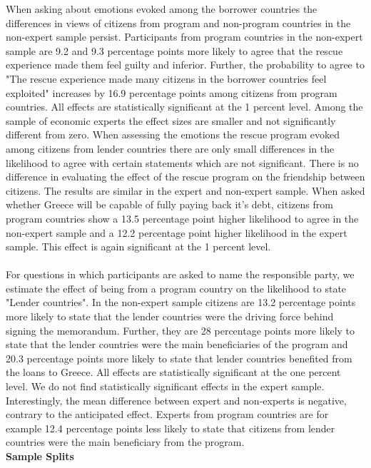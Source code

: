 When asking about emotions evoked among the borrower countries the differences in views of citizens from program and non-program countries in the non-expert sample persist. Participants from program countries in the non-expert sample are 9.2 and 9.3 percentage points more likely to agree that the rescue experience made them feel guilty and inferior. Further, the probability to agree to "The rescue experience made many citizens in the borrower countries feel exploited" increases by 16.9 percentage points among citizens from program countries. All effects are statistically significant at the 1 percent level. Among the sample of economic experts the effect sizes are smaller and not significantly different from zero. When assessing the emotions the rescue program evoked among citizens from lender countries there are only small differences in the likelihood to agree with certain statements which are not significant. There is no difference in evaluating the effect of the rescue program on the friendship between citizens. The results are similar in the expert and non-expert sample. When asked whether Greece will be capable of fully paying back it's debt, citizens from program countries show a 13.5 percentage point higher likelihood to agree in the non-expert sample and a 12.2 percentage point higher likelihood in the expert sample. This effect is again significant at the 1 percent level. \\ \\
For questions in which participants are asked to name the responsible party, we estimate the effect of being from a program country on the likelihood to state "Lender countries". In the non-expert sample citizens are 13.2 percentage points more likely to state that the lender countries were the driving force behind signing the memorandum. Further, they are 28 percentage points more likely to state that the lender countries were the main beneficiaries of the program and 20.3 percentage points more likely to state that lender countries benefited from the loans to Greece. All effects are statistically significant at the one percent level. We do not find statistically significant effects in the expert sample. Interestingly, the mean difference between expert and non-experts is negative, contrary to the anticipated effect. Experts from program countries are for example 12.4 percentage points less likely to state that citizens from lender countries were the main beneficiary from the program.
\\
\textbf{Sample Splits}
